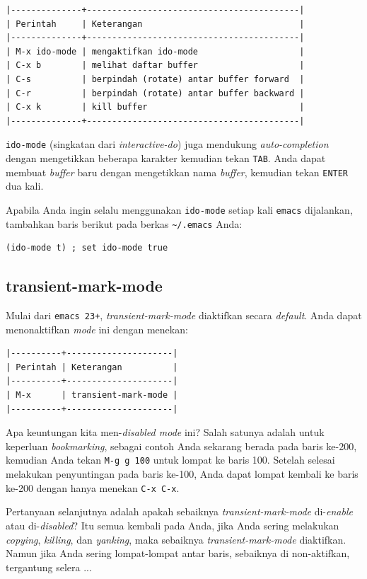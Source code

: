 \documentclass{article}
\begin{document}
\begin{verbatim}
|--------------+------------------------------------------|
| Perintah     | Keterangan                               |
|--------------+------------------------------------------|
| M-x ido-mode | mengaktifkan ido-mode                    |
| C-x b        | melihat daftar buffer                    |
| C-s          | berpindah (rotate) antar buffer forward  |
| C-r          | berpindah (rotate) antar buffer backward |
| C-x k        | kill buffer                              |
|--------------+------------------------------------------|
\end{verbatim}

\verb=ido-mode= (singkatan dari \emph{interactive-do}) juga mendukung 
\emph{auto-completion} dengan mengetikkan beberapa karakter kemudian tekan 
\verb=TAB=. Anda dapat membuat \emph{buffer} baru dengan mengetikkan 
nama \emph{buffer}, kemudian tekan \verb=ENTER= dua kali.

Apabila Anda ingin selalu menggunakan \verb=ido-mode= setiap kali \verb=emacs= 
dijalankan, tambahkan baris berikut pada berkas \verb=~/.emacs= Anda:

\begin{verbatim}
(ido-mode t) ; set ido-mode true
\end{verbatim}

\subsection{transient-mark-mode}
Mulai dari \verb=emacs 23+=, \emph{transient-mark-mode} diaktifkan secara 
\emph{default}. Anda dapat menonaktifkan \emph{mode} ini dengan menekan:

\begin{verbatim}
|----------+---------------------|
| Perintah | Keterangan          |
|----------+---------------------|
| M-x      | transient-mark-mode |
|----------+---------------------|
\end{verbatim}

Apa keuntungan kita men-\emph{disabled mode} ini? Salah satunya adalah untuk
keperluan \emph{bookmarking}, sebagai contoh Anda sekarang berada pada baris
ke-200, kemudian Anda tekan \verb=M-g g 100= untuk lompat ke baris 100. 
Setelah selesai melakukan penyuntingan pada baris ke-100, Anda dapat lompat
kembali ke baris ke-200 dengan hanya menekan \verb=C-x C-x=.

Pertanyaan selanjutnya adalah apakah sebaiknya \emph{transient-mark-mode}
di-\emph{enable} atau di-\emph{disabled}? Itu semua kembali pada Anda, jika
Anda sering melakukan \emph{copying}, \emph{killing}, dan \emph{yanking}, maka
sebaiknya \emph{transient-mark-mode} diaktifkan. Namun jika Anda sering 
lompat-lompat antar baris, sebaiknya di non-aktifkan, tergantung selera ... 
\end{document}

